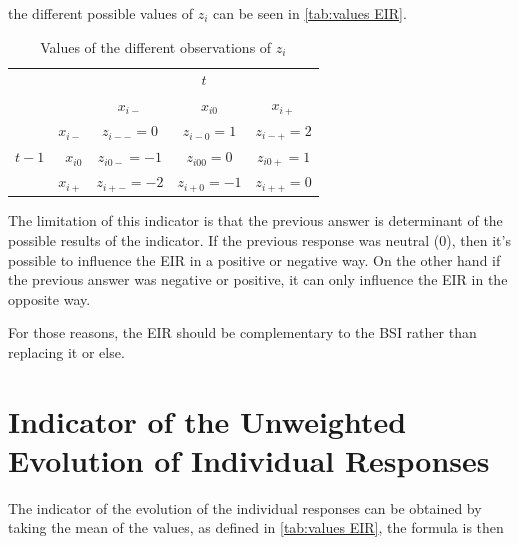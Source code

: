 \documentclass[12pt,a4paper,oneside]{book}
\begin{document}
the different possible values of $z_i$ can be seen in \autoref{tab:values EIR}. 

\begin{table}[htp!]
     \centering \footnotesize
    \begin{tabular}{r | r | c c c | }
    \multicolumn{1}{r}{} & \multicolumn{1}{r}{} &    \multicolumn{3}{c}{$t$} \\ \cline{3-5}
    \multicolumn{1}{r}{} &         & \textbf{$x_{i-}$} & \textbf{$x_{i0}$} & \textbf{$x_{i+}$} \\ \cline{2-5}
           &    \textbf{$x_{i-}$} & $z_{i--}=0$    & $z_{i-0}=1$    & $z_{i-+}=2$ \\ 
    $t-1$ & \textbf{$x_{i0}$}  & $z_{i0-}=-1$    & $z_{i00}=0$    & $z_{i0+}=1$    \\
            & \textbf{$x_{i+}$}& $z_{i+-}=-2$    & $z_{i+0}=-1$    & $z_{i++}=0$ \\ \cline{2-5}
\end{tabular}
    \caption{Values of the different observations of $z_i$}
    \label{tab:values EIR}
\end{table}


The limitation of this indicator is that the previous answer is determinant of the possible results of the indicator. 
If the previous response was neutral (0), then it's possible to influence the EIR in a positive or negative way. 
On the other hand if the previous answer was negative or positive, it can only influence the EIR in the opposite way.

For those reasons, the EIR should be complementary to the BSI rather than replacing it or else.



\section{Indicator of the Unweighted Evolution of Individual Responses}


The indicator of the evolution of the individual responses can be obtained by taking the mean of the values, as defined in \autoref{tab:values EIR}, the formula is then
\end{document}
